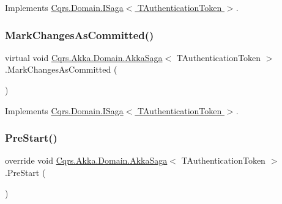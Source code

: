 Implements \hyperlink{interfaceCqrs_1_1Domain_1_1ISaga_a2714804684bc65cf4dec79b4697b9b21_a2714804684bc65cf4dec79b4697b9b21}{Cqrs.\+Domain.\+I\+Saga$<$ T\+Authentication\+Token $>$}.

\mbox{\label{classCqrs_1_1Akka_1_1Domain_1_1AkkaSaga_a83269fac4653cca097461e924feaea7f_a83269fac4653cca097461e924feaea7f}} 
\subsubsection{\texorpdfstring{Mark\+Changes\+As\+Committed()}{MarkChangesAsCommitted()}}
{\footnotesize\ttfamily virtual void \hyperlink{classCqrs_1_1Akka_1_1Domain_1_1AkkaSaga}{Cqrs.\+Akka.\+Domain.\+Akka\+Saga}$<$ T\+Authentication\+Token $>$.Mark\+Changes\+As\+Committed (\begin{DoxyParamCaption}{ }\end{DoxyParamCaption})\hspace{0.3cm}{\ttfamily [virtual]}}



Implements \hyperlink{interfaceCqrs_1_1Domain_1_1ISaga_a85c75f80bc5be4bad7f1d9f1231bfba7_a85c75f80bc5be4bad7f1d9f1231bfba7}{Cqrs.\+Domain.\+I\+Saga$<$ T\+Authentication\+Token $>$}.

\mbox{\label{classCqrs_1_1Akka_1_1Domain_1_1AkkaSaga_a4615beae56f595074f3ba643a890ba74_a4615beae56f595074f3ba643a890ba74}} 
\subsubsection{\texorpdfstring{Pre\+Start()}{PreStart()}}
{\footnotesize\ttfamily override void \hyperlink{classCqrs_1_1Akka_1_1Domain_1_1AkkaSaga}{Cqrs.\+Akka.\+Domain.\+Akka\+Saga}$<$ T\+Authentication\+Token $>$.Pre\+Start (\begin{DoxyParamCaption}{ }\end{DoxyParamCaption})\hspace{0.3cm}{\ttfamily [protected]}}



